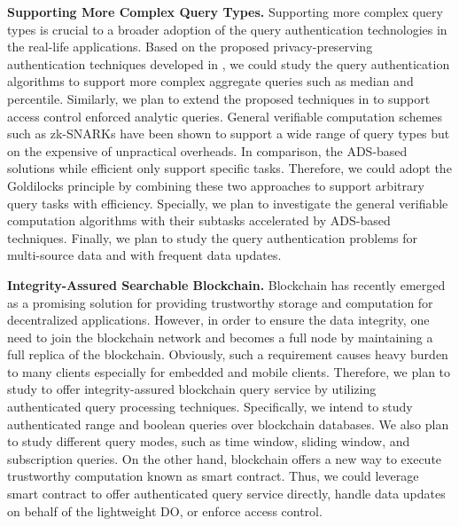 \textbf{Supporting More Complex Query Types.}
Supporting more complex query types is crucial to a broader adoption of the query authentication technologies in the real-life applications.
Based on the proposed privacy-preserving authentication techniques developed in , we could study the query authentication algorithms to support more complex aggregate queries such as median and percentile. Similarly, we plan to extend the proposed techniques in  to support access control enforced analytic queries. General verifiable computation schemes such as zk-SNARKs have been shown to support a wide range of query types but on the expensive of unpractical overheads. In comparison, the ADS-based solutions while efficient only support specific tasks. Therefore, we could adopt the Goldilocks principle by combining these two approaches to support arbitrary query tasks with efficiency. Specially, we plan to investigate the general verifiable computation algorithms with their subtasks accelerated by ADS-based techniques. Finally, we plan to study the query authentication problems for multi-source data and with frequent data updates.

\textbf{Integrity-Assured Searchable Blockchain.}
Blockchain has recently emerged as a promising solution for providing trustworthy storage and computation for decentralized applications. However, in order to ensure the data integrity, one need to join the blockchain network and becomes a full node by maintaining a full replica of the blockchain. Obviously, such a requirement causes heavy burden to many clients especially for embedded and mobile clients. Therefore, we plan to study to offer integrity-assured blockchain query service by utilizing authenticated query processing techniques. Specifically, we intend to study authenticated range and boolean queries over blockchain databases. We also plan to study different query modes, such as time window, sliding window, and subscription queries. On the other hand, blockchain offers a new way to execute trustworthy computation known as smart contract. Thus, we could leverage smart contract to offer authenticated query service directly, handle data updates on behalf of the lightweight DO, or enforce access control.

